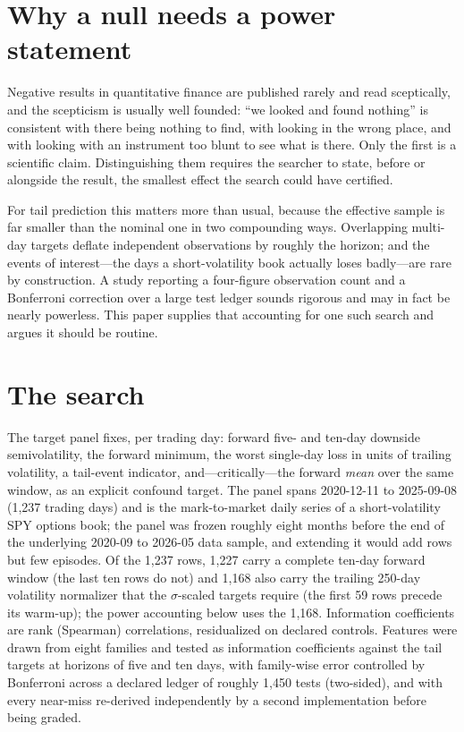 \documentclass[11pt]{article}
\begin{document}
\section{Why a null needs a power statement}
Negative results in quantitative finance are published rarely and read sceptically, and the
scepticism is usually well founded: ``we looked and found nothing'' is consistent with there
being nothing to find, with looking in the wrong place, and with looking with an instrument too
blunt to see what is there. Only the first is a scientific claim. Distinguishing them requires
the searcher to state, before or alongside the result, the smallest effect the search could
have certified.

For tail prediction this matters more than usual, because the effective sample is far smaller
than the nominal one in two compounding ways. Overlapping multi-day targets deflate independent
observations by roughly the horizon; and the events of interest---the days a
short-volatility book actually loses badly---are rare by construction. A study reporting
a four-figure observation count and a Bonferroni correction over a large test ledger sounds rigorous
and may in fact be nearly powerless. This paper supplies that accounting for one such search
and argues it should be routine.

\section{The search}
The target panel fixes, per trading day: forward five- and ten-day downside semivolatility, the
forward minimum, the worst single-day loss in units of trailing volatility, a tail-event
indicator, and---critically---the forward \emph{mean} over the same window, as an explicit
confound target. The panel spans 2020-12-11 to 2025-09-08 (1{,}237 trading days) and is the
mark-to-market daily series of a short-volatility SPY options book; the panel was frozen
roughly eight months before the end of the underlying 2020-09 to 2026-05 data sample, and
extending it would add rows but few episodes. Of the 1{,}237 rows, 1{,}227 carry a complete
ten-day forward window (the last ten rows do not) and 1{,}168 also carry the trailing 250-day
volatility normalizer that the $\sigma$-scaled targets require (the first 59 rows precede its
warm-up); the power accounting below uses the 1{,}168. Information coefficients are rank
(Spearman) correlations, residualized on declared controls. Features were
drawn from eight families and tested as information coefficients against the tail targets at
horizons of five and ten days, with family-wise error controlled by Bonferroni across a
declared ledger of roughly 1{,}450 tests (two-sided), and with every near-miss re-derived
independently by a second implementation before being graded.
\end{document}
